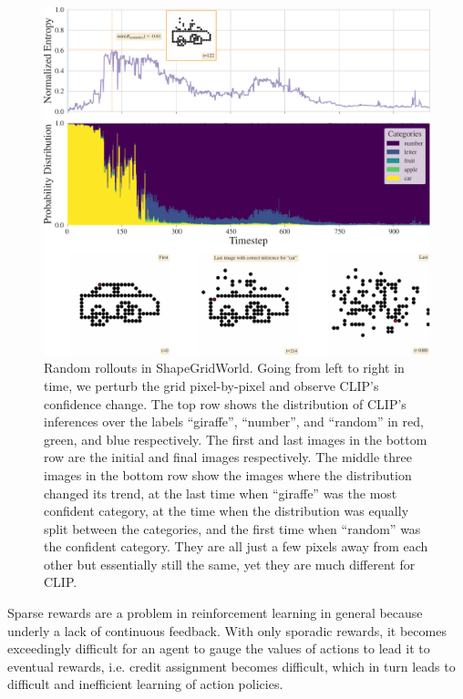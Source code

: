 \begin{figure}[h]
    \centering
    \includegraphics[width=\textwidth]{images/sparse_rewards.pdf}
    \caption[Random rollouts in ShapeGridWorld.]{Random rollouts in ShapeGridWorld. Going from left to right in time, we perturb the grid pixel-by-pixel and observe CLIP's confidence change. The top row shows the distribution of CLIP's inferences over the labels ``giraffe'', ``number'', and ``random'' in red, green, and blue respectively. The first and last images in the bottom row are the initial and final images respectively.
    The middle three images in the bottom row show the images where the distribution changed its trend, at the last time when ``giraffe'' was the most confident category, at the time when the distribution was equally split between the categories, and the first time when ``random'' was the confident category.
    They are all just a few pixels away from each other but essentially still the same, yet they are much different for CLIP.}
    \label{fig:sparse-rewards}
    
\end{figure}

Sparse rewards are a problem in reinforcement learning in general because underly a lack of continuous feedback. 
With only sporadic rewards, it becomes exceedingly difficult for an agent to gauge the values of actions to lead it to eventual rewards, i.e. credit assignment becomes difficult, which in turn leads to difficult and inefficient learning of action policies.

